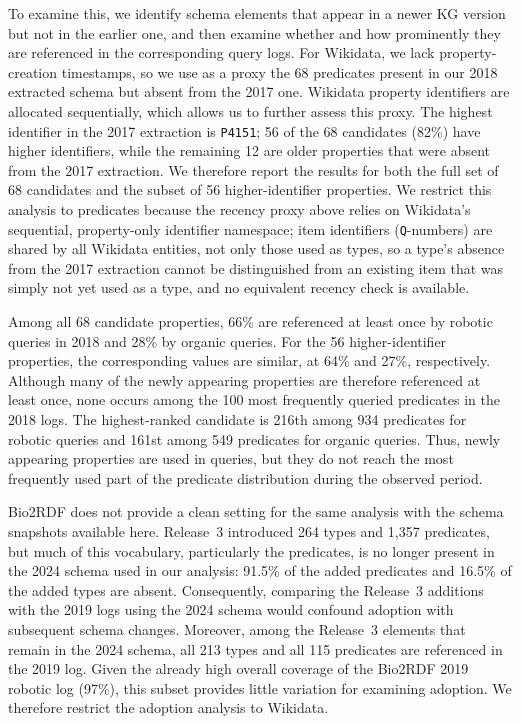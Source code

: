 \documentclass[sw]{iosart2x}
\begin{document}
To examine this, we identify schema elements that appear in a newer KG version but not in the earlier one, and then examine whether and how prominently they are referenced in the corresponding query logs. For Wikidata, we lack property-creation timestamps, so we use as a proxy the 68 predicates present in our 2018 extracted schema but absent from the 2017 one. Wikidata property identifiers are allocated sequentially, which allows us to further assess this proxy. The highest identifier in the 2017 extraction is \texttt{P4151}; 56 of the 68 candidates (82\%) have higher identifiers, while the remaining 12 are older properties that were absent from the 2017 extraction. We therefore report the results for both the full set of 68 candidates and the subset of 56 higher-identifier properties. We restrict this analysis to predicates because the recency proxy above relies on Wikidata's sequential, property-only identifier namespace; item identifiers (\texttt{Q}-numbers) are shared by all Wikidata entities, not only those used as types, so a type's absence from the 2017 extraction cannot be distinguished from an existing item that was simply not yet used as a type, and no equivalent recency check is available.

Among all 68 candidate properties, 66\% are referenced at least once by robotic queries in 2018 and 28\% by organic queries. For the 56 higher-identifier properties, the corresponding values are similar, at 64\% and 27\%, respectively. Although many of the newly appearing properties are therefore referenced at least once, none occurs among the 100 most frequently queried predicates in the 2018 logs. The highest-ranked candidate is 216th among 934 predicates for robotic queries and 161st among 549 predicates for organic queries. Thus, newly appearing properties are used in queries, but they do not reach the most frequently used part of the predicate distribution during the observed period.

Bio2RDF does not provide a clean setting for the same analysis with the schema snapshots available here. Release~3 introduced 264 types and 1{,}357 predicates, but much of this vocabulary, particularly the predicates, is no longer present in the 2024 schema used in our analysis: 91.5\% of the added predicates and 16.5\% of the added types are absent. Consequently, comparing the Release~3 additions with the 2019 logs using the 2024 schema would confound adoption with subsequent schema changes. Moreover, among the Release~3 elements that remain in the 2024 schema, all 213 types and all 115 predicates are referenced in the 2019 log. Given the already high overall coverage of the Bio2RDF 2019 robotic log (97\%), this subset provides little variation for examining adoption. We therefore restrict the adoption analysis to Wikidata.
\end{document}

